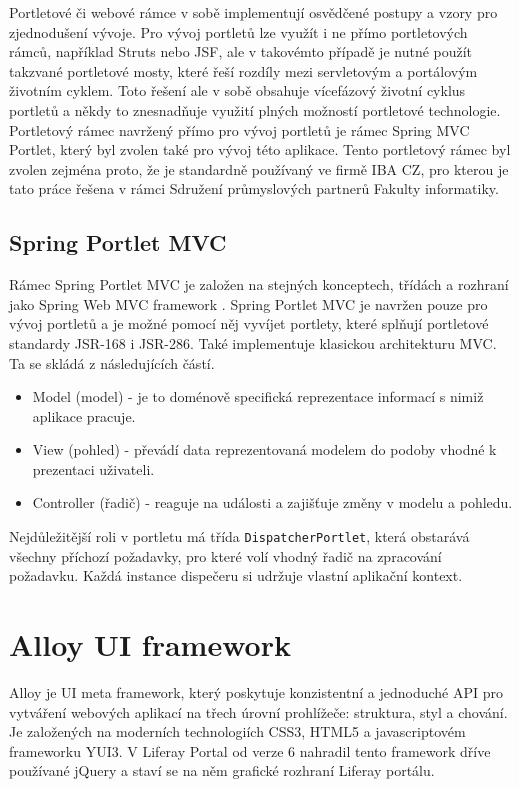 \documentclass{fithesis}
\begin{document}
Portletové či webové rámce v sobě implementují osvědčené postupy a vzory pro zjednodušení vývoje. Pro vývoj portletů lze využít i ne přímo portletových rámců, například Struts nebo JSF, ale v takovémto případě je nutné použít takzvané portletové mosty, které řeší rozdíly mezi servletovým a portálovým životním cyklem. Toto řešení ale v sobě obsahuje vícefázový životní cyklus portletů a někdy to znesnadňuje využití plných možností portletové technologie. Portletový rámec navržený přímo pro vývoj portletů je rámec Spring MVC Portlet, který byl zvolen také pro vývoj této aplikace. Tento portletový rámec byl zvolen zejména proto, že je standardně používaný ve firmě IBA CZ, pro kterou je tato práce řešena v rámci Sdružení průmyslových partnerů Fakulty informatiky.

\subsection{Spring Portlet MVC}
Rámec Spring Portlet MVC je založen na stejných konceptech, třídách a rozhraní jako Spring Web MVC framework \cite{spring-web-mvc}. Spring Portlet MVC je navržen pouze pro vývoj portletů a je možné pomocí něj vyvíjet portlety, které splňují portletové standardy JSR-168 i JSR-286. Také implementuje klasickou architekturu MVC. Ta se skládá z následujících částí. \cite{mvc} 

\begin{itemize}
\item Model (model) - je to doménově specifická reprezentace informací s nimiž aplikace pracuje.
\item View (pohled) - převádí data reprezentovaná modelem do podoby vhodné k prezentaci uživateli.
\item Controller (řadič) - reaguje na události a zajišťuje změny v modelu a pohledu.
\end{itemize}

Nejdůležitější roli v portletu má třída \verb|DispatcherPortlet|, která obstarává všechny příchozí požadavky, pro které volí vhodný řadič na zpracování požadavku. Každá instance dispečeru si udržuje vlastní aplikační kontext.


\section{Alloy UI framework}
Alloy je UI meta framework, který poskytuje konzistentní a jednoduché API pro vytváření webových aplikací na třech úrovní prohlížeče: struktura, styl a chování. Je založených na moderních technologiích CSS3, HTML5 a javascriptovém frameworku YUI3. \cite{alloy} V Liferay Portal od verze 6 nahradil tento framework dříve používané jQuery a staví se na něm grafické rozhraní Liferay portálu. 
\end{document}
